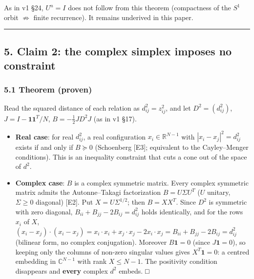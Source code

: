 \documentclass[
  10pt,
  a4paper,
]{article}
\providecommand{\tightlist}{%
  \setlength{\itemsep}{0pt}\setlength{\parskip}{0pt}}
\begin{document}
As in v1 §24, \(U^n=I\) does not follow from this theorem (compactness
of the \(S^1\) orbit \(\not\Rightarrow\) finite recurrence). It remains
underived in this paper.

\begin{center}\rule{0.5\linewidth}{0.5pt}\end{center}

\subsection{5. Claim 2: the complex simplex imposes no
constraint}\label{claim-2-the-complex-simplex-imposes-no-constraint}

\subsubsection{5.1 Theorem (proven)}\label{theorem-proven}

Read the squared distance of each relation as \(d^2_{ij}=z_{ij}^2\), and
let \(D^2=(d^2_{ij})\), \(J=I-\mathbf 1\mathbf 1^T/N\),
\(B=-\tfrac12JD^2J\) (as in v1 §17).

\begin{itemize}
\tightlist
\item
  \textbf{Real case}: for real \(d^2_{ij}\), a real configuration
  \(x_i\in\mathbb R^{N-1}\) with \(|x_i-x_j|^2=d^2_{ij}\) exists if and
  only if \(B\succeq0\) (Schoenberg {[}E3{]}; equivalent to the
  Cayley--Menger conditions). This is an inequality constraint that cuts
  a cone out of the space of \(d^2\).
\item
  \textbf{Complex case}: \(B\) is a complex symmetric matrix. Every
  complex symmetric matrix admits the Autonne--Takagi factorization
  \(B=U\Sigma U^T\) (\(U\) unitary, \(\Sigma\ge0\) diagonal) {[}E2{]}.
  Put \(X=U\Sigma^{1/2}\); then \(B=XX^T\). Since \(D^2\) is symmetric
  with zero diagonal, \(B_{ii}+B_{jj}-2B_{ij}=d^2_{ij}\) holds
  identically, and for the rows \(x_i\) of \(X\),
  \((x_i-x_j)\cdot(x_i-x_j)=x_i\cdot x_i+x_j\cdot x_j-2x_i\cdot x_j=B_{ii}+B_{jj}-2B_{ij}=d^2_{ij}\)
  (bilinear form, no complex conjugation). Moreover \(B\mathbf 1=0\)
  (since \(J\mathbf1=0\)), so keeping only the columns of non-zero
  singular values gives \(X^T\mathbf1=0\): a centred embedding in
  \(\mathbb C^{N-1}\) with rank \(X\le N-1\). The positivity condition
  disappears and \textbf{every} complex \(d^2\) embeds. □
\end{itemize}
\end{document}

